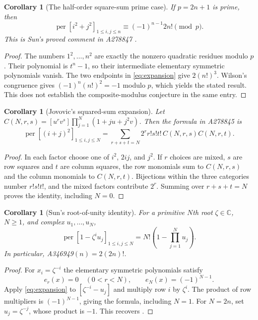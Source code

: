 \documentclass[11pt]{article}
\newcommand{\per}{\operatorname{per}}
\newtheorem{corollary}[theorem]{Corollary}
\begin{document}
\begin{corollary}[The half-order square-sum prime case]\label{squareprime}
If $p=2n+1$ is prime, then
\[
 \per[i^2+j^2]_{1\le i,j\le n}
 \equiv(-1)^{n-1}2n!\pmod p.
\]
This is Sun's proved comment in A278847 \cite{powers}.
\end{corollary}
\begin{proof}
The numbers $1^2,\ldots,n^2$ are exactly the nonzero quadratic
residues modulo $p$. Their polynomial is $t^n-1$, so their
intermediate elementary symmetric polynomials vanish.
The two endpoints in \eqref{eq:expansion} give $2(n!)^3$.
Wilson's congruence gives $(-1)^n(n!)^2=-1$ modulo $p$,
which yields the stated result. This does not establish the
composite-modulus conjecture in the same entry.
\end{proof}

\begin{corollary}[Jovovic's squared-sum expansion]\label{squaredsum}
Let $C(N,r,s)=[u^rv^s]\prod_{j=1}^N(1+ju+j^2v)$.
Then the formula in A278845 \cite[FORMULA, October 25, 2026]{squares} is
\[
 \per[(i+j)^2]_{1\le i,j\le N}
 =\sum_{r+s+t=N}2^r r!s!t!\,C(N,r,s)C(N,r,t).
\]
\end{corollary}
\begin{proof}
In each factor choose one of $i^2$, $2ij$, and $j^2$.
If $r$ choices are mixed, $s$ are row squares and $t$ are column
squares, the row monomials sum to $C(N,r,s)$ and the column
monomials to $C(N,r,t)$. Bijections within the three categories
number $r!s!t!$, and the mixed factors contribute $2^r$.
Summing over $r+s+t=N$ proves the identity, including $N=0$.
\end{proof}

\begin{corollary}[Sun's root-of-unity identity]\label{rootsidentity}
For a primitive $N$th root $\zeta\in\mathbb C$, $N\ge1$, and
complex $u_1,\ldots,u_N$,
\[
 \per[1-\zeta^iu_j]_{1\le i,j\le N}
 =N!\left(1-\prod_{j=1}^Nu_j\right).
\]
In particular, A346949$(n)=2(2n)!$.
\end{corollary}
\begin{proof}
For $x_i=\zeta^{-i}$ the elementary symmetric polynomials satisfy
\[
 e_r(x)=0\quad(0<r<N),\qquad e_N(x)=(-1)^{N-1}.
\]
Apply \eqref{eq:expansion} to $[\zeta^{-i}-u_j]$ and multiply
row $i$ by $\zeta^i$. The product of row multipliers is
$(-1)^{N-1}$, giving the formula, including $N=1$.
For $N=2n$, set $u_j=\zeta^{-j}$, whose product is $-1$.
This recovers \cite[Theorem 1.2(i), (1.3)]{sun}.
\end{proof}
\end{document}
